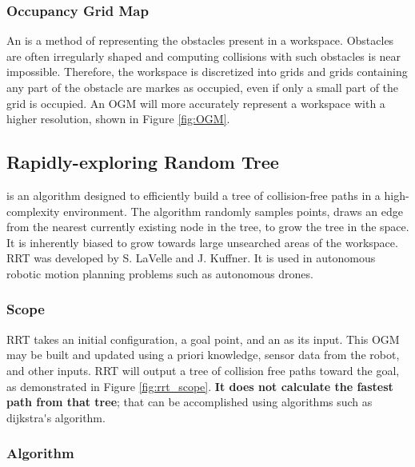     

    \subsubsection{Occupancy Grid Map}
    An  is a method of representing the obstacles present in a \gls{workspace}. Obstacles are often irregularly shaped and computing collisions with such obstacles is near impossible. Therefore, the \gls{workspace} is discretized into grids and grids containing any part of the obstacle are markes as occupied, even if only a small part of the grid is occupied. An \gls{OGM} will more accurately represent a \gls{workspace} with a higher resolution, shown in Figure \ref{fig:OGM}.

    

\subsection{Rapidly-exploring Random Tree}
    
     is an algorithm designed to efficiently build a tree of collision-free paths in a high-complexity environment. The algorithm randomly samples points, draws an edge from the nearest currently existing node in the tree, to grow the tree in the space. It is inherently biased to grow towards large unsearched areas of the workspace. RRT was developed by S. LaVelle\cite{LaValle1998} and J. Kuffner\cite{LaValle2001}. It is used in autonomous robotic motion planning problems such as autonomous drones.

    \subsubsection{Scope}
        \gls{RRT} takes an initial configuration, a goal point, and an  as its input. This \gls{OGM} may be built and updated using \gls{a priori} knowledge, sensor data from the robot, and other inputs. \gls{RRT} will output a tree of collision free paths toward the goal, as demonstrated in Figure \ref{fig:rrt_scope}. \textbf{It does not calculate the fastest path from that tree}; that can be accomplished using algorithms such as \Gls{dijkstra's algorithm}.

        

    \subsubsection{Algorithm}

